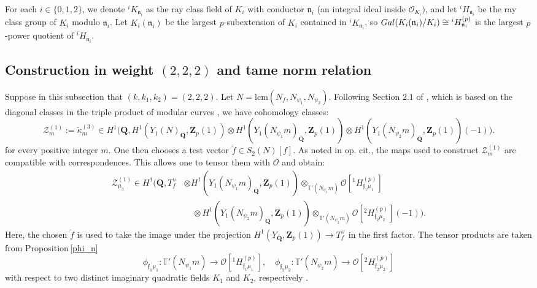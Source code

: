 \documentclass[10pt,letterpaper]{amsart}
\theoremstyle{plain}
\theoremstyle{definition}
\theoremstyle{definition}
\theoremstyle{plain}
\theoremstyle{plain}
\theoremstyle{plain}
\theoremstyle{remark}
\numberwithin{equation}{section}
\newcommand{\fkn}{\mathfrak{n}}
\DeclareMathOperator{\et}{\acute{e}t}
\def\cO{\mathcal O}
\newcommand{\Q}{\mathbf{Q}}
\newcommand{\Z}{\mathbf{Z}}
\begin{document}
For each $i\in \{0,1,2\}$, we denote $^{i}K_{\fkn_i}$ as the ray class field of $K_i$ with conductor $\fkn_i$ (an integral ideal inside $\mathcal{O}_{K_i})$, and let $^{i}H_{\fkn_i}$ be the ray class group of $K_i$ modulo $\fkn_i$. Let $K_i(\fkn_i)$ be the largest $p$-subextension of $K_i$ contained in $^{i}K_{\fkn_i}$, so ${\rm Gal}(K_i(\fkn_i)/K_i)\cong {^{i}H_{\fkn_i}^{(p)}}$ is the largest $p$-power quotient of $^{i}H_{\fkn_i}$. 



\subsection{Construction in weight $(2,2,2)$ and tame norm relation}
\label{subsec:tame}
 Suppose in this subsection that $(k,k_1,k_2)=(2,2,2)$. Let $N=\text{lcm}(N_f,N_{\psi_1},N_{\psi_2})$. Following Section $2.1$ of \cite{CD}, which is based on the diagonal classes in the triple product of modular curves \cite[Sec.\,3]{BSV}, we have cohomology classes:
\begin{equation}\label{kappa3}
\mathcal{Z}_m^{(1)}:=\tilde{\kappa}_{m}^{(3)}\in H^1\bigl(\Q,H^1_{\et}(Y_1(N)_{\overline{\Q}},\Z_p(1))\otimes H^1_{\et}(Y_1(N_{\psi_1}m)_{\overline{\Q}},\Z_p(1))\otimes H^1_{\et}(Y_1(N_{\psi_2}m)_{\overline{\Q}},\Z_p(1))(-1)\bigr).
\end{equation}
for every positive integer $m$. One then chooses a test vector $\breve{f}\in S_2(N)[f]$. As noted in op. cit., the maps used to construct $\mathcal{Z}_m^{(1)}$ are compatible with correspondences. This allows one to tensor them with $\cO$ and obtain:
\begin{align*}
\mathcal{Z}_{\mu_3}^{(1)}\in H^1\bigl(\Q,T_{f}^{\vee}&\otimes H^1_{\et}(Y_1(N_{\psi_1}m)_{\overline{\Q}},\Z_p(1))\otimes_{\mathbb{T}'(N_{\psi_1}m)}\mathcal{O}[^{1}H_{\mathfrak{f}_1\mu_1}^{(p)}]\\
 &\quad\otimes H^1_{\et}(Y_1(N_{\psi_2}m)_{\overline{\Q}},\Z_p(1))\otimes_{\mathbb{T}'(N_{\psi_2}m)}\mathcal{O}[^{2}H_{\mathfrak{f}_2\mu_2}^{(p)}](-1)\bigr).
\end{align*}
Here, the chosen $\breve{f}$ is used to take the image under the  projection $H^1_{\et}(Y_{\overline{\Q}},\Z_p(1))\rightarrow T_f^\vee$ in the first factor. The tensor products are taken from Proposition\,\ref{phi_n} 
\[
\phi_{\mathfrak{f}_1\mu_1}:\mathbb{T}'(N_{\psi_1}m)\rightarrow\mathcal{O}[^{1}H_{\mathfrak{f}_1\mu_1}^{(p)}],\quad 
\phi_{\mathfrak{f}_2\mu_2}:\mathbb{T}'(N_{\psi_2}m)\rightarrow\mathcal{O}[^{2}H_{\mathfrak{f}_2\mu_2}^{(p)}]
\]
with respect to two distinct imaginary quadratic fields $K_1$ and $K_2$, respectively .  
\end{document}
